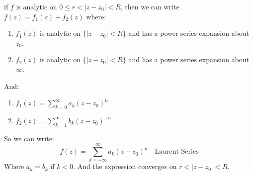 \begin{theorem}
    if $f$ is analytic on $0 \leq r < |z - z_0| < R$, then we can write $f(z)  = f_1(z) + f_2(z)$ where:
    \begin{enumerate}
        \item $f_1(z)$ is analytic on $\{|z - z_0| < R\}$ and has a power series expansion about $z_0$.
        \item $f_2(z)$ is analytic on $\{|z - z_0| < R\}$ and has a power series expansion about $\infty$.
    \end{enumerate}
    And:
    \begin{enumerate}
        \item $f_1(z) = \sum_{k=0}^{\infty} a_k(z - z_0)^n$
        \item $f_2(z) = \sum_{k=1}^{\infty} b_k(z - z_0)^{-n}$
    \end{enumerate}
    So we can write:
    \begin{equation}
        \boxed{f(z) = \sum_{k = -\infty}^{\infty} a_k(z - z_0)^n} \quad \text{Laurent Series}
    \end{equation}
    Where $a_k = b_k$ if $k < 0$.
    And the expression converges on $r < |z - z_0| < R$.
\end{theorem}

